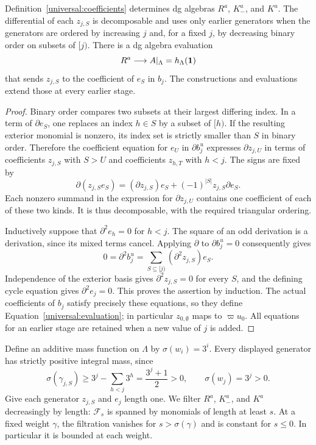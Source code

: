\begin{lemma}\label{universal:triangular}
Definition~\ref{universal:coefficients} determines dg algebras
$R^a$, $K_-^a$, and $K^a$. The differential of each $z_{j,S}$ is
decomposable and uses only earlier generators when the generators
are ordered by increasing $j$ and, for a fixed $j$, by decreasing
binary order on subsets of $[j)$. There is a dg algebra evaluation
\begin{equation}\label{universal:evaluation}
 R^a\longrightarrow A|_\Lambda=h_\Lambda(\mathbf 1)
\end{equation}
that sends $z_{j,S}$ to the coefficient of $e_S$ in $b_j$.
The constructions and evaluations extend those at every earlier stage.
\end{lemma}

\begin{proof}
Binary order compares two subsets at their largest differing index.
In a term of $\partial e_S$, one replaces an index $h\in S$ by a
subset of $[h)$. If the resulting exterior monomial is nonzero, its
index set is strictly smaller than $S$ in binary order. Therefore the
coefficient equation for $e_U$ in $\partial b_j^u$ expresses
$\partial z_{j,U}$ in terms of coefficients $z_{j,S}$ with $S>U$
and coefficients $z_{h,T}$ with $h<j$. The signs are fixed by
\[
 \partial(z_{j,S}e_S)
 = (\partial z_{j,S})e_S
    +(-1)^{|S|}z_{j,S}\partial e_S.
\]
Each nonzero summand in the expression for $\partial z_{j,U}$
contains one coefficient of each of these two kinds. It is thus
decomposable, with the required triangular ordering.

Inductively suppose that $\partial^2 e_h=0$ for $h<j$.
The square of an odd derivation is a derivation, since its mixed
terms cancel. Applying $\partial$ to $\partial b_j^u=0$ consequently
gives
\[
 0=\partial^2 b_j^u
   =\sum_{S\subseteq[j)}(\partial^2 z_{j,S})e_S.
\]
Independence of the exterior basis gives
$\partial^2z_{j,S}=0$ for every $S$, and the defining cycle equation
gives $\partial^2e_j=0$. This proves the assertion by induction.
The actual coefficients of $b_j$ satisfy precisely these equations,
so they define Equation~\eqref{universal:evaluation}; in particular
$z_{0,\emptyset}$ maps to $\varpi u_0$. All equations for an earlier
stage are retained when a new value of $j$ is added.
\end{proof}

Define an additive mass function on $\Lambda$ by
$\sigma(w_i)=3^i$. Every displayed generator has strictly positive
integral mass, since
\begin{equation}\label{universal:positive-mass}
 \sigma(\gamma_{j,S})
 \geq 3^j-\sum_{h<j}3^h=\frac{3^j+1}{2}>0,
 \qquad \sigma(w_j)=3^j>0.
\end{equation}
Give each generator $z_{j,S}$ and $e_j$ length one. We filter
$R^a$, $K_-^a$, and $K^a$ decreasingly by length: $\mathcal F_s$
is spanned by monomials of length at least $s$. At a fixed weight
$\gamma$, the filtration vanishes for $s>\sigma(\gamma)$ and is
constant for $s\leq0$. In particular it is bounded at each weight.

